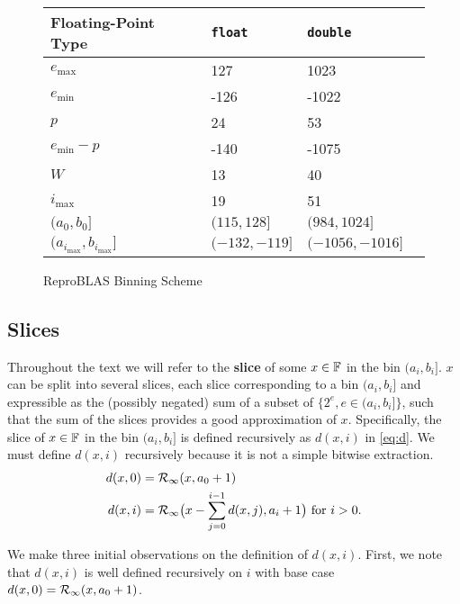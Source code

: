     \begin{figure}[H]
        \centering
        \begin{tabular}{ | l | l | l | p{5cm} |} \hline
            Floating-Point Type & \texttt{float} & \texttt{double}\\ \hline
            $e_{\max}$ & 127 & 1023\\ \hline
            $e_{\min}$ &  -126 & -1022 \\ \hline
            $p$ & 24 & 53 \\ \hline
            $e_{\min} - p$ & -140 & -1075 \\ \hline
            $W$ & 13 & 40 \\ \hline
            $i_{\max}$ & 19 & 51 \\ \hline
            $(a_0, b_0]$ & $(115, 128]$ & $(984, 1024]$\\ \hline
            $(a_{i_{\max}}, b_{i_{\max}}]$ & $(-132, -119]$ & $(-1056, -1016]$ \\ \hline
        \end{tabular}
        \caption{ReproBLAS Binning Scheme}
        \label{fig:bins}
    \end{figure}

    \subsection{Slices}
    \label{sec:binning_slices}
    Throughout the text we will refer to the \textbf{slice} of some $x \in \mathbb{F}$
    in the bin $(a_i, b_i]$. $x$ can be split into several slices, each slice
    corresponding to a bin $(a_i, b_i]$ and expressible as the (possibly
    negated) sum of a subset of $\{2^e, e \in (a_i, b_i]\}$, such that the sum
    of the slices provides a good approximation of $x$. Specifically, the slice
    of $x \in \mathbb{F}$ in the bin $(a_i, b_i]$ is defined recursively as $d(x, i)$
    in \eqref{eq:d}. We must define $d(x, i)$ recursively because it is not a
    simple bitwise extraction.
    \begin{equation}
      \begin{aligned}
      d(x,0) & = \mathcal{R}_\text{$\infty$}(x, a_0+1) \\
      d(x, i) & = \mathcal{R}_\text{$\infty$}\bigl(x - \sum\limits_{j=0}^{i - 1}d(x,j), a_i + 1\bigr)
        \text{ for } i > 0.
      \end{aligned}
      \label{eq:d}
    \end{equation}

    We make three initial observations on the definition of $d(x, i)$. First,
    we note that $d(x, i)$ is well defined recursively on $i$ with base case
    $d(x, 0) = \mathcal{R}_\text{$\infty$}(x, a_0 + 1)$.

